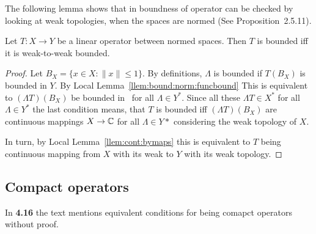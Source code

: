 The following lemma shows that in boundness of operator
can be checked by looking at weak topologies, when the spaces are normed
(See \cite{Megginson1998} Proposition~2.5.11).
\begin{llem} \label{llem:op:normbd:weakbd}
Let \(T:X\to Y\) be a linear operator between normed spaces.
Then $T$ is bounded iff it is weak-to-weak bounded.
\end{llem}
\begin{proof}
Let \(B_X = \{x\in X: \|x\|\leq 1\}\).
By definitions, \(\Lambda\) is bounded if \(T(B_X)\) is bounded in $Y$. 
By Local Lemma~\ref{llem:bound:norm:funcbound} 
This is equivalent to  \((\Lambda T)(B_X)\) be bounded in \C\ for
all \(\Lambda \in Y^*\).
Since all these \(\Lambda T \in X^*\) for all \(\Lambda \in Y^*\)
the last condition means, that $T$ is bounded
iff  \((\Lambda T)(B_X)\) are continuous mappings \(X\to\mathbb{C}\)
for all \(\Lambda \in Y*\) considering the weak topology of $X$.

In turn, by Local Lemma~\ref{llem:cont:bymaps} this is equivalent 
to $T$ being continuous mapping 
from $X$ with its weak to $Y$ with its weak topology.
\end{proof}

\subsection{Compact operators}

In \textbf{4.16} the text mentions equivalent conditions
for being comapct operators without proof.

